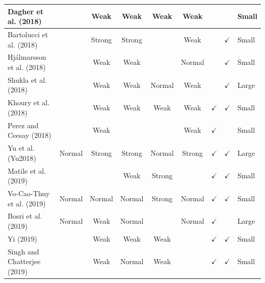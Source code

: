 \documentclass[../access.tex]{subfiles}
\begin{document}
\begin{table}[htbp]
\begin{adjustwidth}{-1cm}{}
\begin{tabular}{m{4.4cm} c c c c c c c >{\centering\arraybackslash}m{0.7cm}}
                    \hline
                    \footnotesize{Dagher et al. (2018) \cite{Dagher2018}} & {} & {Weak} & {Weak} & {Weak} & {Weak} & {} & {} & \footnotesize{Small} \\
                    \hline
                    \footnotesize{Bartolucci et al. (2018) \cite{Bartolucci2018}} & {} & {Strong} & {Strong} & {} & {Weak} & {} & $ \checkmark $ & \footnotesize{Small} \\
                    \hline
                    \footnotesize{Hj\'{a}lmarsson et al. (2018) \cite{Hjalmarsson2018}} & {} & {Weak} & {Weak} & {} & {Normal} & {} & $ \checkmark $ & \footnotesize{Small} \\
                    \hline
                    \footnotesize{Shukla et al. (2018) \cite{Shukla2018}} & {} & {Weak} & {Weak} & {Normal} & {Weak} & {} & $ \checkmark $ & \footnotesize{Large} \\
                    \hline
                    \footnotesize{Khoury et al. (2018) \cite{Khoury2018}} & {} & {Weak} & {Weak} & {Weak} & {Weak} & $ \checkmark $ & $ \checkmark $ & \footnotesize{Small} \\
                    \hline
                    \footnotesize{Perez and Ceesay (2018) \cite{Perez2018}} & {} & {Weak} & {} & {} & {Weak} & $ \checkmark $ & {} & \footnotesize{Small} \\
                    \hline
                    \footnotesize{Yu et al. (Yu2018) \cite{Yu2018}} & {Normal} & {Strong} & {Strong} & {Normal} & {Strong} & $ \checkmark $ & $ \checkmark $ & \footnotesize{Large} \\
                    \hline
                    \footnotesize{Matile et al. (2019) \cite{Matile2019}} & {} & {} & {Weak} & {Strong} & {} & $ \checkmark $ & $ \checkmark $ & \footnotesize{Small} \\
                    \hline
                    \footnotesize{Vo-Cao-Thuy et al. (2019) \cite{Vo-Cao-Thuy2019}} & {Normal} & {Normal} & {Normal} & {Strong} & {Normal} & $ \checkmark $ & $ \checkmark $ & \footnotesize{Small} \\
                    \hline
                    \footnotesize{Bosri et al. (2019) \cite{Bosri2019}} & {Normal} & {Weak} & {Normal} & {} & {Normal} & $ \checkmark $ & {} & \footnotesize{Large} \\
                    \hline
                    \footnotesize{Yi (2019) \cite{Yi2019}} & {} & {Weak} & {Weak} & {Weak} & {} & $ \checkmark $ & $ \checkmark $ & \footnotesize{Small} \\
                    \hline
                    \footnotesize{Singh and Chatterjee (2019) \cite{Singh2019}} & {} & {Weak} & {Normal} & {Weak} & {} & $ \checkmark $ & $ \checkmark $ & \footnotesize{Small} \\
                    \bottomrule
                \end{tabular}
            \end{adjustwidth}
            \label{tbl:table3}
        \end{table}
\end{document}
